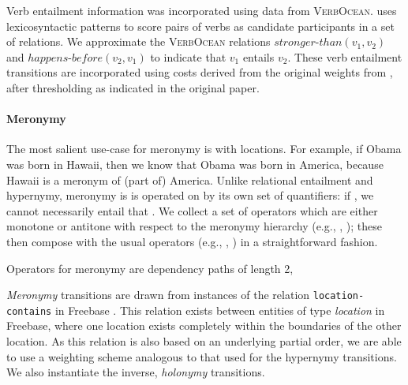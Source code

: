 Verb entailment information was incorporated using data from \textsc{VerbOcean}.
 uses lexicosyntactic patterns to score pairs of verbs as candidate participants in a set of relations.
We approximate the \textsc{VerbOcean} relations $\mathit{stronger\text{-}than}(v_1,v_2)$ and $\mathit{happens\text{-}before}(v_2,v_1)$ to indicate that $v_1$ entails $v_2$.
These verb entailment transitions are incorporated using costs derived from the original weights from , after thresholding as indicated in the original paper. 

\paragraph{Meronymy}
The most salient use-case for meronymy is with locations.
For example, if Obama was born in Hawaii, then we know that Obama was born in
  America, because Hawaii is a meronym of (part of) America.
Unlike relational entailment and hypernymy, meronymy is is operated on by its own
  set of quantifiers:
  if , we cannot necessarily entail that .
We collect a set of operators which are either monotone or antitone with respect
  to the meronymy hierarchy (e.g., , ); 
  these then compose with the usual operators (e.g., , ) in a
  straightforward fashion.

  Operators for meronymy are dependency paths of length 2, 

\textit{Meronymy} transitions are drawn from instances of the relation \texttt{location-contains} in Freebase \cite{key:2008bollacker-freebase}.
This relation exists between entities of type \textit{location} in Freebase, where one location exists completely within the boundaries of the other location.
As this relation is also based on an underlying partial order, we are able to use a weighting scheme analogous to that used for the hypernymy transitions.
We also instantiate the inverse, \textit{holonymy} transitions.


